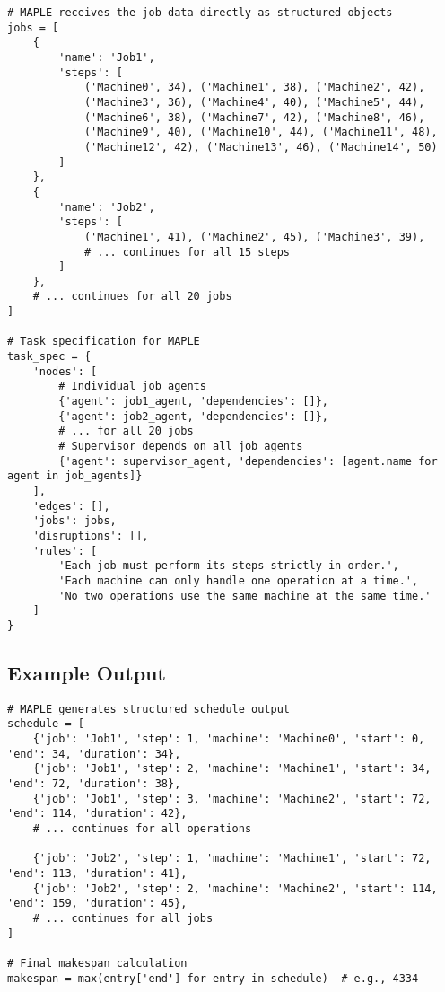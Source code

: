 \documentclass[11pt]{article}
\begin{document}
\begin{lstlisting}[caption=MAPLE Input Example]
# MAPLE receives the job data directly as structured objects
jobs = [
    {
        'name': 'Job1',
        'steps': [
            ('Machine0', 34), ('Machine1', 38), ('Machine2', 42), 
            ('Machine3', 36), ('Machine4', 40), ('Machine5', 44),
            ('Machine6', 38), ('Machine7', 42), ('Machine8', 46),
            ('Machine9', 40), ('Machine10', 44), ('Machine11', 48),
            ('Machine12', 42), ('Machine13', 46), ('Machine14', 50)
        ]
    },
    {
        'name': 'Job2', 
        'steps': [
            ('Machine1', 41), ('Machine2', 45), ('Machine3', 39),
            # ... continues for all 15 steps
        ]
    },
    # ... continues for all 20 jobs
]

# Task specification for MAPLE
task_spec = {
    'nodes': [
        # Individual job agents
        {'agent': job1_agent, 'dependencies': []},
        {'agent': job2_agent, 'dependencies': []},
        # ... for all 20 jobs
        # Supervisor depends on all job agents
        {'agent': supervisor_agent, 'dependencies': [agent.name for agent in job_agents]}
    ],
    'edges': [],
    'jobs': jobs,
    'disruptions': [],
    'rules': [
        'Each job must perform its steps strictly in order.',
        'Each machine can only handle one operation at a time.',
        'No two operations use the same machine at the same time.'
    ]
}
\end{lstlisting}

\subsection{Example Output}

\begin{lstlisting}[caption=MAPLE Output Example]
# MAPLE generates structured schedule output
schedule = [
    {'job': 'Job1', 'step': 1, 'machine': 'Machine0', 'start': 0, 'end': 34, 'duration': 34},
    {'job': 'Job1', 'step': 2, 'machine': 'Machine1', 'start': 34, 'end': 72, 'duration': 38},
    {'job': 'Job1', 'step': 3, 'machine': 'Machine2', 'start': 72, 'end': 114, 'duration': 42},
    # ... continues for all operations
    
    {'job': 'Job2', 'step': 1, 'machine': 'Machine1', 'start': 72, 'end': 113, 'duration': 41},
    {'job': 'Job2', 'step': 2, 'machine': 'Machine2', 'start': 114, 'end': 159, 'duration': 45},
    # ... continues for all jobs
]

# Final makespan calculation
makespan = max(entry['end'] for entry in schedule)  # e.g., 4334
\end{lstlisting}
\end{document}
